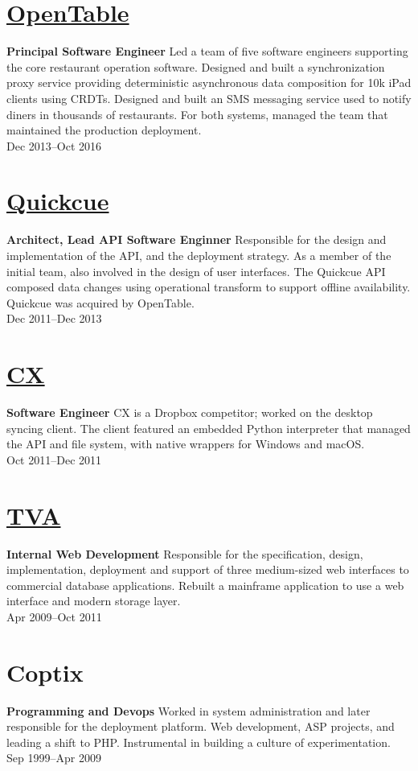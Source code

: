 \documentclass[margin]{res}
\begin{document}
\begin{resume}
\section{\href{https://opentable.com/}{OpenTable}}
{\bf Principal Software Engineer}
%
Led a team of five software engineers supporting the core restaurant
operation software. Designed and built a synchronization proxy service
providing deterministic asynchronous data composition for 10k iPad
clients using CRDTs. Designed and built an SMS messaging service used
to notify diners in thousands of restaurants. For both systems,
managed the team that maintained the production deployment.\\
%
Dec 2013--Oct 2016

\section{\href{https://quickcue.com/}{Quickcue}}
{\bf Architect, Lead API Software Enginner}
%
Responsible for the design and implementation of the API, and the
deployment strategy. As a member of the initial team, also involved in
the design of user interfaces. The Quickcue API composed data changes
using operational transform to support offline availability. Quickcue
was acquired by OpenTable.\\
%
Dec 2011--Dec 2013

\section{\href{https://www.cx.com/}{CX}}
{\bf Software Engineer}
%
CX is a Dropbox competitor; worked on the desktop syncing client. The
client featured an embedded Python interpreter that managed the API
and file system, with native wrappers for Windows and macOS.\\
%
Oct 2011--Dec 2011

\section{\href{http://tva.gov/}{TVA}}
{\bf Internal Web Development}
%
Responsible for the specification, design, implementation, deployment
and support of three medium-sized web interfaces to commercial
database applications. Rebuilt a mainframe application to use a web
interface and modern storage layer.\\
%
Apr 2009--Oct 2011

\section{Coptix}
{\bf Programming and Devops}
%
Worked in system administration and later responsible for the
deployment platform. Web development, ASP projects, and leading a
shift to PHP. Instrumental in building a culture of experimentation.\\
%
Sep 1999--Apr 2009


\end{resume}
\end{document}

